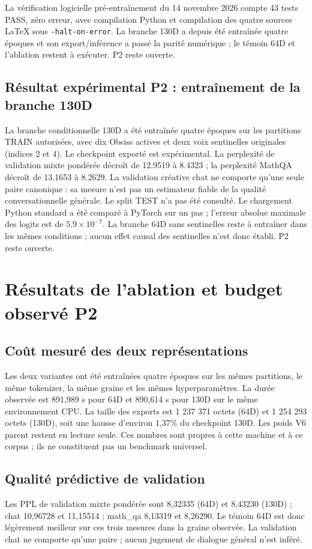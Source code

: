 \documentclass[11pt,a4paper]{report}
\begin{document}
La vérification logicielle pré-entraînement du 14 novembre 2026 compte 43 tests PASS, zéro erreur, avec compilation Python et compilation des quatre sources LaTeX sous \texttt{-halt-on-error}. La branche 130D a depuis été entraînée quatre époques et son export/inférence a passé la parité numérique ; le témoin 64D et l’ablation restent à exécuter. P2 reste ouverte.

\section{Résultat expérimental P2 : entraînement de la branche 130D}
\label{sec:p2-training-130d}
La branche conditionnelle 130D a été entraînée quatre époques sur les partitions TRAIN autorisées, avec dix Obsiss actives et deux voix sentinelles originales (indices 2 et 4). Le checkpoint exporté est expérimental. La perplexité de validation mixte pondérée décroît de 12.9519 à 8.4323 ; la perplexité MathQA décroît de 13.1653 à 8.2629. La validation créative chat ne comporte qu'une seule paire canonique : sa mesure n'est pas un estimateur fiable de la qualité conversationnelle générale. Le split TEST n'a pas été consulté. Le chargement Python standard a été comparé à PyTorch sur un pas ; l'erreur absolue maximale des logits est de $5.9\times10^{-7}$. La branche 64D sans sentinelles reste à entraîner dans les mêmes conditions ; aucun effet causal des sentinelles n'est donc établi. P2 reste ouverte.

\chapter{Résultats de l'ablation et budget observé P2}
\section{Coût mesuré des deux représentations}
Les deux variantes ont été entraînées quatre époques sur les mêmes partitions, le même tokenizer, la même graine et les mêmes hyperparamètres. La durée observée est 891,989 s pour 64D et 890,614 s pour 130D sur le même environnement CPU. La taille des exports est 1 237 371 octets (64D) et 1 254 293 octets (130D), soit une hausse d'environ 1,37\% du checkpoint 130D. Les poids V6 parent restent en lecture seule. Ces nombres sont propres à cette machine et à ce corpus ; ils ne constituent pas un benchmark universel.
\section{Qualité prédictive de validation}
Les PPL de validation mixte pondérée sont 8,32335 (64D) et 8,43230 (130D) ; chat 10,96728 et 11,15514 ; math\_qa 8,13319 et 8,26290. Le témoin 64D est donc légèrement meilleur sur ces trois mesures dans la graine observée. La validation chat ne comporte qu'une paire ; aucun jugement de dialogue général n'est inféré.
\end{document}
